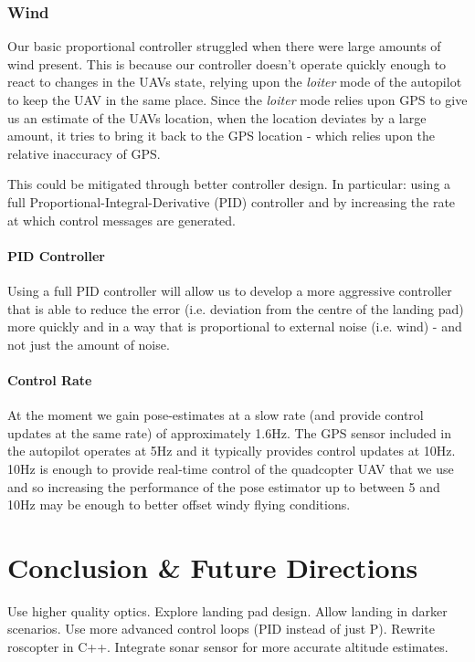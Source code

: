 \documentclass[10pt]{scrartcl} %
\begin{document}
\subsubsection{Wind}
Our basic proportional controller struggled when there were large amounts of wind present. This is because our controller doesn't operate quickly enough to react to changes in the UAVs state, relying upon the \textit{loiter} mode of the autopilot to keep the UAV in the same place. Since the \textit{loiter} mode relies upon GPS to give us an estimate of the UAVs location, when the location deviates by a large amount, it tries to bring it back to the GPS location - which relies upon the relative inaccuracy of GPS.

This could be mitigated through better controller design. In particular: using a full Proportional-Integral-Derivative (PID) controller and by increasing the rate at which control messages are generated.

\paragraph{PID Controller}
Using a full PID controller will allow us to develop a more aggressive controller that is able to reduce the error (i.e. deviation from the centre of the landing pad) more quickly and in a way that is proportional to external noise (i.e. wind) - and not just the amount of noise.

\paragraph{Control Rate}
At the moment we gain pose-estimates at a slow rate (and provide control updates at the same rate) of approximately 1.6Hz. The GPS sensor included in the autopilot operates at 5Hz and it typically provides control updates at 10Hz. 10Hz is enough to provide real-time control of the quadcopter UAV that we use and so increasing the performance of the pose estimator up to between 5 and 10Hz may be enough to better offset windy flying conditions.

\section{Conclusion \& Future Directions}

Use higher quality optics.
Explore landing pad design.
Allow landing in darker scenarios.
Use more advanced control loops (PID instead of just P).
Rewrite roscopter in C++.
Integrate sonar sensor for more accurate altitude estimates.

\printbibliography
\end{document}
